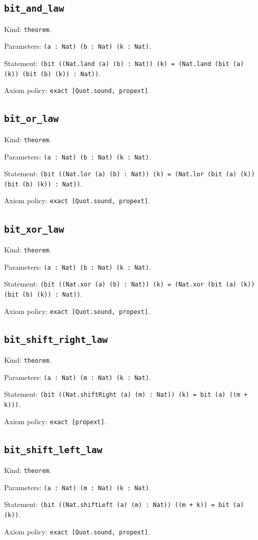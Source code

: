 \documentclass[11pt]{article}
\begin{document}
\subsection*{\texttt{bit\_and\_law}}
\noindent Kind: \texttt{theorem}.\par
\noindent Parameters: \texttt{(a : Nat) (b : Nat) (k : Nat)}.\par
\noindent Statement: \texttt{(bit ((Nat.land (a) (b) : Nat)) (k) = (Nat.land (bit (a) (k)) (bit (b) (k)) : Nat))}.\par
\noindent Axiom policy: \texttt{exact [Quot.sound, propext]}.\par
\subsection*{\texttt{bit\_or\_law}}
\noindent Kind: \texttt{theorem}.\par
\noindent Parameters: \texttt{(a : Nat) (b : Nat) (k : Nat)}.\par
\noindent Statement: \texttt{(bit ((Nat.lor (a) (b) : Nat)) (k) = (Nat.lor (bit (a) (k)) (bit (b) (k)) : Nat))}.\par
\noindent Axiom policy: \texttt{exact [Quot.sound, propext]}.\par
\subsection*{\texttt{bit\_xor\_law}}
\noindent Kind: \texttt{theorem}.\par
\noindent Parameters: \texttt{(a : Nat) (b : Nat) (k : Nat)}.\par
\noindent Statement: \texttt{(bit ((Nat.xor (a) (b) : Nat)) (k) = (Nat.xor (bit (a) (k)) (bit (b) (k)) : Nat))}.\par
\noindent Axiom policy: \texttt{exact [Quot.sound, propext]}.\par
\subsection*{\texttt{bit\_shift\_right\_law}}
\noindent Kind: \texttt{theorem}.\par
\noindent Parameters: \texttt{(a : Nat) (m : Nat) (k : Nat)}.\par
\noindent Statement: \texttt{(bit ((Nat.shiftRight (a) (m) : Nat)) (k) = bit (a) ((m + k)))}.\par
\noindent Axiom policy: \texttt{exact [propext]}.\par
\subsection*{\texttt{bit\_shift\_left\_law}}
\noindent Kind: \texttt{theorem}.\par
\noindent Parameters: \texttt{(a : Nat) (m : Nat) (k : Nat)}.\par
\noindent Statement: \texttt{(bit ((Nat.shiftLeft (a) (m) : Nat)) ((m + k)) = bit (a) (k))}.\par
\noindent Axiom policy: \texttt{exact [Quot.sound, propext]}.\par
\end{document}
